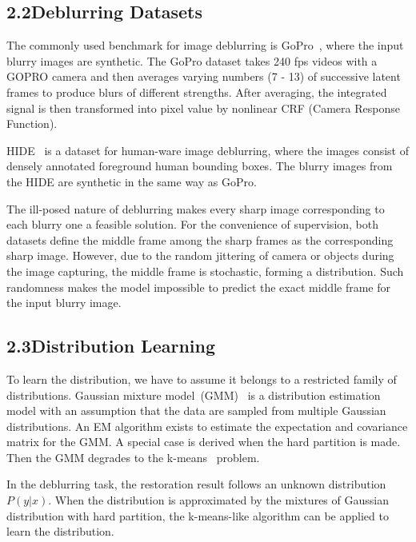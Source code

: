 \documentclass[letterpaper]{article} \usepackage{aaai23}  \usepackage{times}  \usepackage{helvet}  \usepackage{courier}  \usepackage[hyphens]{url}  \usepackage{graphicx} \urlstyle{rm} \def\UrlFont{\rm}  \usepackage{natbib}  \usepackage{caption} \frenchspacing  \setlength{\pdfpagewidth}{8.5in} \setlength{\pdfpageheight}{11in} \usepackage{algorithm}
\begin{document}
\subsection{2.2\quad Deblurring Datasets}

The commonly used benchmark for image deblurring is GoPro~\cite{Nah_2017_CVPR}, where the input blurry images are synthetic. The GoPro dataset takes 240 fps videos with a GOPRO camera and then averages varying numbers (7 - 13) of successive latent frames to produce blurs of different strengths. After averaging, the integrated signal is then transformed into pixel value by nonlinear CRF (Camera Response Function). 

HIDE~\cite{shen2019human} is a dataset for human-ware image deblurring, where the images consist of densely annotated foreground human bounding boxes. The blurry images from the HIDE are synthetic in the same way as GoPro.



The ill-posed nature of deblurring makes every sharp image corresponding to each blurry one a feasible solution. For the convenience of supervision, both datasets define the middle frame among the sharp frames as the corresponding sharp image. However, due to the random jittering of camera or objects during the image capturing, the middle frame is stochastic, forming a distribution. Such randomness makes the model impossible to predict the exact middle frame for the input blurry image.

\subsection{2.3\quad Distribution Learning}

To learn the distribution, we have to assume it belongs to a restricted family of distributions. Gaussian mixture model~(GMM)~\cite{Reynolds2009} is a distribution estimation model with an assumption that the data are sampled from multiple Gaussian distributions. An EM algorithm exists to estimate the expectation and covariance matrix for the GMM. A special case is derived when the hard partition is made. Then the GMM degrades to the k-means~\cite{lloyd1982least} problem. 

In the deblurring task, the restoration result follows an unknown distribution $P(y|x)$. When the distribution is approximated by the mixtures of Gaussian distribution with hard partition, the k-means-like algorithm can be applied to learn the distribution.
\end{document}
